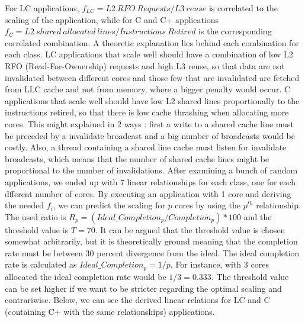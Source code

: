 \documentclass[diploma]{Styles/softlab-thesis}
\begin{document}
For LC applications, $f_{LC}=L2 \  RFO \  Requests/L3 \  reuse$ is correlated  to the scaling of the application,  while for C and C+ applications $f_{C}=L2 \  shared \  allocated \  lines/ Instructions \  Retired$ is the corresponding correlated combination. A theoretic explanation lies behind each combination for each class. LC applications that scale well should have a combination of low L2 RFO (Read-For-Ownership) requests and high L3 reuse, so that data are not invalidated between different cores and those few that are invalidated are fetched from LLC cache and not from memory, where a bigger penalty would occur. C applications that scale well should have low L2 shared lines proportionally to the instructions retired, so that there is low cache thrashing when allocating more cores. This might explained in 2 ways : first a write to a shared cache line must be preceded by a invalidate broadcast and a big number of broadcasts would be costly. Also, a thread containing a shared line cache must listen for invalidate broadcasts, which means that the number of shared cache lines might be proportional to the number of invalidations. After examining a bunch of random applications, we ended up with 7 linear relationships for each class, one for each dfferent number of cores. By executing an application with 1 core and deriving the needed $f_{i}$, we can predict the scaling for $p$ cores by using the $p^{th}$ relationship. The used ratio is $R_{p} = (Ideal\_Completion_{p} / Completion_{p})*100$ and the threshold value is $T=70$. It can be argued that the threshold value is chosen somewhat arbitrarily, but it is theoretically ground meaning that the completion rate must  be between 30 percent divergence from the ideal. The ideal completion rate is calculated as $Ideal\_Completion_{p}=1/p$. For instance, with 3 cores allocated the ideal completion rate would be $1/3=0.333$. The threshold value can be set higher if we want to be stricter regarding the optimal scaling and contrariwise. Below, we can see the derived linear relations for LC and C (containing C+ with the same relationships) applications. 
\end{document}
